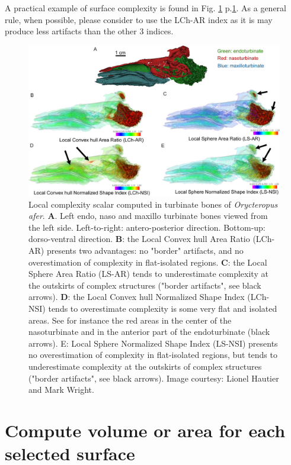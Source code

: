 A practical example of surface complexity is found in Fig. \ref{complexityexample} p.\ref{complexityexample}. As a general rule, when possible, please consider to use the LCh-AR index as it is may produce less artifacts than the other 3 indices.
\begin{figure}
  \centering
  \includegraphics[scale=0.38]{images/11/complexity_example.jpg} 
	\caption{ 
Local complexity scalar computed in turbinate bones of \textit{Orycteropus afer}. \textbf{A}. Left endo, naso and maxillo turbinate bones viewed from the left side. Left-to-right: antero-posterior direction. Bottom-up: dorso-ventral direction. \textbf{B}: the Local Convex hull Area Ratio (LCh-AR) presents two advantages: no "border" artifacts, and no overestimation of complexity in flat-isolated regions.  \textbf{C}: the Local Sphere Area Ratio (LS-AR) tends to underestimate complexity at the outskirts of complex structures ("border artifacts", see black arrows).  \textbf{D}: the Local Convex hull Normalized Shape Index (LCh-NSI) tends to overestimate complexity is some very flat and isolated areas. See for instance the red areas in the center of the nasoturbinate and in the anterior part of the endoturbinate (black arrows). E: Local Sphere Normalized Shape Index (LS-NSI) presents no overestimation of complexity in flat-isolated regions, but tends to underestimate complexity at the outskirts of complex structures ("border artifacts", see black arrows). Image courtesy: Lionel Hautier and Mark Wright.
	}
\label{complexityexample}
\end{figure}

\section{Compute volume or area for each selected surface}


